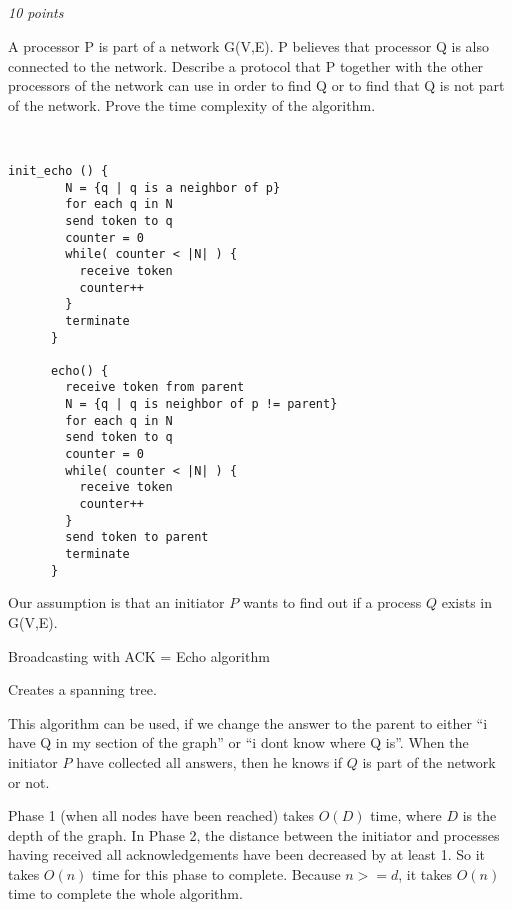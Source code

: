 \documentclass[a4paper]{article}
\newcommand{\points}[1]{\subsection{} \textit{#1 points}\\}
\newcommand{\question}[2][]{
  \parbox[t]{\textwidth}{
    \ifthenelse{\equal{#1}{}}{}{#1)}
    \parbox[t]{0.95\textwidth}{#2}}\\}
\newcommand{\solution}[2][]{
  \ifthenelse{\equal{#1}{} \or \equal{#1}{a}}{\\[3pt]\textit{Solution: }\\[0.1cm]}{}
  \parbox[t]{\textwidth}{
    \ifthenelse{\equal{#1}{}}{}{#1)}
    \parbox[t]{0.95\textwidth}{#2}}\\
}
\begin{document}
\points{10}
\question{
  A processor P is part of a network G(V,E). P believes that processor
  Q is also connected to the network. Describe a protocol that P
  together with the other processors of the network can use in order to
  find Q or to find that Q is not part of the network. Prove the time
  complexity of the algorithm.
}
%
\begin{lrbox}{\userinput}
  \begin{minipage}{\linewidth}
    \begin{lstlisting}[mathescape]
      init_echo () {
        N = {q | q is a neighbor of p}
        for each q in N
        send token to q
        counter = 0
        while( counter < |N| ) {
          receive token
          counter++
        }
        terminate
      }

      echo() {
        receive token from parent
        N = {q | q is neighbor of p != parent}
        for each q in N
        send token to q
        counter = 0
        while( counter < |N| ) {
          receive token
          counter++
        }
        send token to parent
        terminate
      }
    \end{lstlisting}
  \end{minipage}
\end{lrbox}
%
\solution{
  Our assumption is that an initiator $P$ wants to find out if a
  process $Q$ exists in G(V,E).


  Broadcasting with ACK = Echo algorithm

  Creates a spanning tree.

  \usebox{\userinput}

  This algorithm can be used, if we change the answer to the parent to
  either ``i have Q in my section of the graph'' or ``i dont know
  where Q is''.
  When the initiator $P$ have collected all answers, then he knows if
  $Q$ is part of the network or not.

  Phase 1 (when all nodes have been reached) takes $O(D)$ time, where
  $D$ is the depth of the graph. In Phase 2, the distance between the
  initiator and processes having received all acknowledgements have been
  decreased by at least 1. So it takes $O(n)$ time for this phase to complete.
  Because $ n >= d $, it takes $O(n)$ time to complete the whole
  algorithm.
}
\end{document}
